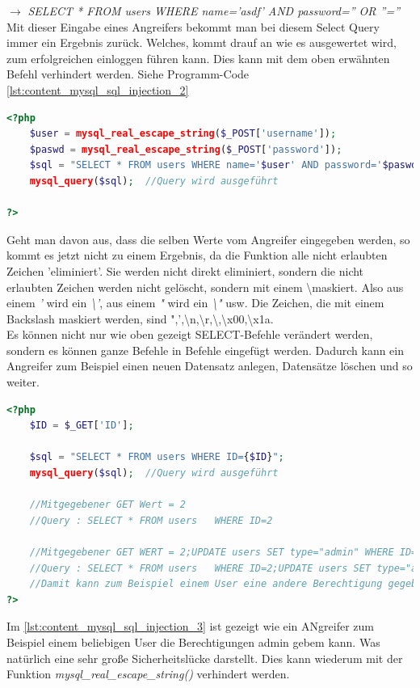 $ \rightarrow $ \textit{SELECT * FROM users WHERE name='asdf' AND password='' OR ''=''}\\
Mit dieser Eingabe eines Angreifers bekommt man bei diesem Select Query immer ein Ergebnis zurück. Welches, kommt drauf an wie es ausgewertet wird, zum erfolgreichen einloggen führen kann. Dies kann mit dem oben erwähnten Befehl verhindert werden. Siehe Programm-Code \ref{lst:content_mysql_sql_injection_2}
\begin{lstlisting}[style=custom, language=PHP, caption={MySQL Injection: Richtig},label={lst:content_mysql_sql_injection_2}]
<?php 
	$user = mysql_real_escape_string($_POST['username']);
	$paswd = mysql_real_escape_string($_POST['password']);
	$sql = "SELECT * FROM users WHERE name='$user' AND password='$paswd'";	//Die kontrollierten Werte werden in den Query Übernommen
	mysql_query($sql);	//Query wird ausgeführt
	
?>
\end{lstlisting}
Geht man davon aus, dass die selben Werte vom Angreifer eingegeben werden, so kommt es jetzt nicht zu einem Ergebnis, da die Funktion alle nicht erlaubten Zeichen 'eliminiert'. Sie werden nicht direkt eliminiert, sondern die nicht erlaubten Zeichen werden nicht gelöscht, sondern mit einem \textbackslash maskiert. Also aus einem \textit{'} wird ein \textit{\textbackslash'}, aus einem \textit{"} wird ein \textit{\textbackslash"} usw. Die Zeichen, die mit einem Backslash maskiert werden, sind ",',\textbackslash n,\textbackslash r,\textbackslash,\textbackslash x00,\textbackslash x1a.\\
Es können nicht nur wie oben gezeigt SELECT-Befehle verändert werden, sondern es können ganze Befehle in Befehle eingefügt werden. Dadurch kann ein Angreifer zum Beispiel einen neuen Datensatz anlegen, Datensätze löschen und so weiter.
\begin{lstlisting}[style=custom, language=PHP, caption={MySQL Injection: Beispiel Query in Qeury},label={lst:content_mysql_sql_injection_3}]
<?php 
	$ID = $_GET['ID'];
	
	$sql = "SELECT * FROM users	WHERE ID={$ID}";
	mysql_query($sql);	//Query wird ausgeführt
	
	//Mitgegebener GET Wert = 2
	//Query : SELECT * FROM users	WHERE ID=2
	
	//Mitgegebener GET WERT = 2;UPDATE users SET type="admin" WHERE ID=23
	//Query : SELECT * FROM users	WHERE ID=2;UPDATE users SET type="admin" WHERE ID=23
	//Damit kann zum Beispiel einem User eine andere Berechtigung gegeben werden
?>
\end{lstlisting}
Im \autoref{lst:content_mysql_sql_injection_3} ist gezeigt wie ein ANgreifer zum Beispiel einem beliebigen User die Berechtigungen admin gebem kann. Was natürlich eine sehr große Sicherheitslücke darstellt. Dies kann wiederum mit der Funktion \textit{mysql\_real\_escape\_string()} verhindert werden.